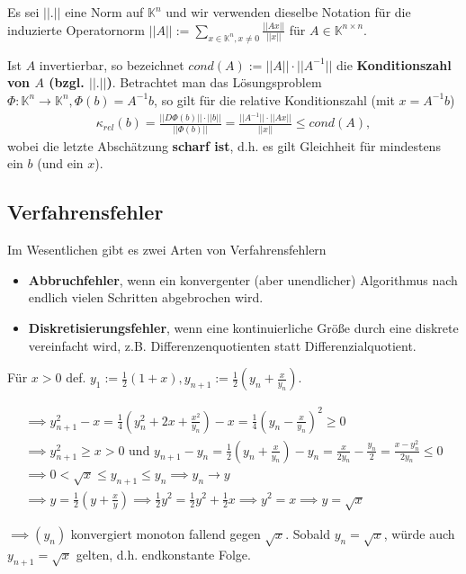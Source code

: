 \begin{example}
	Es sei $||.||$ eine Norm auf $\mathbb{K}^n$ und wir verwenden dieselbe Notation für die induzierte Operatornorm $||A|| := \sum_{x\in \mathbb{K}^n, x \neq 0}\frac{||Ax||}{||x||}$ für $A \in \mathbb{K}^{n\times n}$.
	
	Ist $A$ invertierbar, so bezeichnet $cond(A) := ||A|| \cdot ||A^{-1}||$ die \textbf{Konditionszahl von $A$ (bzgl. $||.||$)}. Betrachtet man das Lösungsproblem $\Phi:\mathbb{K}^n \rightarrow \mathbb{K}^n, \Phi(b) = A^{-1}b$, so gilt für die relative Konditionszahl (mit $x=A^{-1}b$)
	\begin{align*}
		\kappa_{rel}(b) = \frac{||D\Phi(b)|| \cdot ||b||}{||\Phi(b)||} = \frac{||A^{-1}|| \cdot ||Ax||}{||x||} \leq cond(A),
	\end{align*}
	wobei die letzte Abschätzung \textbf{scharf ist}, d.h. es gilt Gleichheit für mindestens ein $b$ (und ein $x$).
\end{example}

\subsection{Verfahrensfehler}

Im Wesentlichen gibt es zwei Arten von Verfahrensfehlern

\begin{itemize}
	\item \textbf{Abbruchfehler}, wenn ein konvergenter (aber unendlicher) Algorithmus nach endlich vielen Schritten abgebrochen wird.
	\item \textbf{Diskretisierungsfehler}, wenn eine kontinuierliche Größe durch eine diskrete vereinfacht wird, z.B. Differenzenquotienten statt Differenzialquotient.
\end{itemize}

\begin{example}
	Für $x>0$ def. $y_1 := \frac{1}{2} (1+x), y_{n+1} := \frac{1}{2}(y_n + \frac{x}{y_n})$.
	
	\begin{align*}
		\implies y_{n+1}^2 - x = \frac{1}{4} (y_n^2 + 2x + \frac{x^2}{y_n}) - x = \frac{1}{4} (y_n - \frac{x}{y_n})^2 \geq 0\\
		\implies y_{n+1}^2 \geq x > 0 \text{ und } y_{n+1} - y_n = \frac{1}{2} (y_n + \frac{x}{y_n}) - y_n = \frac{x}{2y_n} - \frac{y_n}{2} = \frac{x-y_n^2}{2y_n} \leq 0\\
		\implies 0 < \sqrt{x} \leq y_{n+1} \leq y_n \implies y_n \rightarrow y\\
		\implies y = \frac{1}{2}(y + \frac{x}{y}) \implies \frac{1}{2}y^2 = \frac{1}{2}y^2 + \frac{1}{2}x \implies y^2 = x \implies y = \sqrt{x}
	\end{align*}
	
	$\implies (y_n)$ konvergiert monoton fallend gegen $\sqrt{x}$. Sobald $y_n = \sqrt{x}$, würde auch $y_{n+1} = \sqrt{x}$ gelten, d.h. endkonstante Folge.
\end{example}

